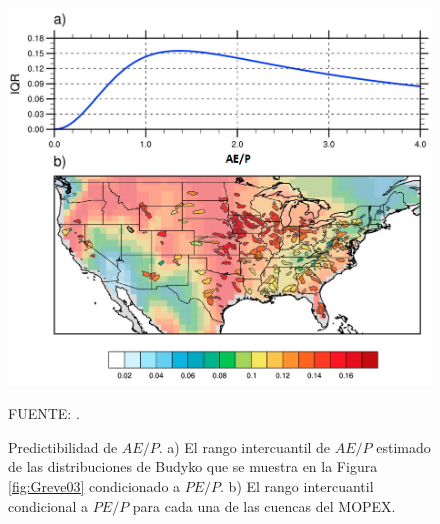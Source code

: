 \begin{figure}[ht]
\centering
	\includegraphics[scale=0.55]{Images/Greve04.png}
	\caption{Predictibilidad de $AE/P$. a) El rango intercuantil de $AE/P$ estimado de las distribuciones de Budyko que se muestra en la Figura \ref{fig:Greve03} condicionado a $PE/P$. b) El rango intercuantil condicional a $PE/P$ para cada una de las cuencas del MOPEX.}
	{\raggedright FUENTE: \citet{Greve2015}. \par}
	\label{fig:Greve04}
\end{figure}